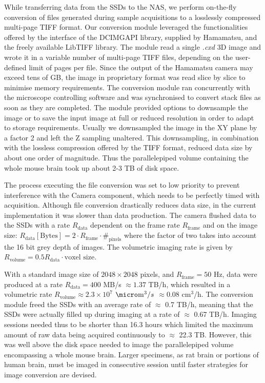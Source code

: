\documentclass[12pt]{spieman}  %
\begin{document}
\begin{spacing}{2}
While transferring data from the SSDs to the NAS, we perform on-the-fly conversion of files generated during sample acquisitions to a losslessly compressed multi-page TIFF format. Our conversion module leveraged the functionalities offered by the interface of the DCIMGAPI library, supplied by Hamamatsu, and the freely available LibTIFF library. The module read a single \textit{.cxd} 3D image and wrote it in a variable number of multi-page TIFF files, depending on the user-defined limit of pages per file. Since the output of the Hamamatsu camera may exceed tens of GB, the image in proprietary format was read slice by slice to minimise memory requirements. The conversion module ran concurrently with the microscope controlling software and was synchronised to convert stack files as soon as they are completed. The module provided options to downsample the image or to save the input image at full or reduced resolution in order to adapt to storage requirements. Usually we downsampled the image in the XY plane by a factor 2 and left the Z sampling unaltered. This downsampling, in combination with the lossless compression offered by the TIFF format, reduced data size by about one order of magnitude. Thus the parallelepiped volume containing the whole mouse brain took up about 2-3 TB of disk space. 

The process executing the file conversion was set to low priority to prevent interference with the Camera component, which needs to be perfectly timed with acquisition. Although file conversion drastically reduces data size, in the current implementation it was slower than data production. The camera flushed data to the SSDs with a rate $R_{\text{data}}$ dependent on the frame rate $R_{\text{frame}}$ and on the image size: $R_{\text{data}} [\text{Bytes}] = 2\cdot R_{\text{frame}} \cdot \#_{\text{pixels}}$
where the factor of two takes into account the 16 bit grey depth of images. The volumetric imaging rate is given by $R_{\text{volume}} = 0.5 R_{\text{data}} \cdot \text{voxel size}$.

With a standard image size of $2048 \times 2048$ pixels, and $R_{\text{frame}}=50$ Hz, data were produced at a rate $R_{\text{data}}=400$ MB/s $\approx 1.37$ TB/h, which resulted in a volumetric rate $R_{\text{volume}} \approx 2.3 \times 10^7$ $\micro\text{m}^3/s$ $\approx 0.08$ $\text{cm}^3$/h. The conversion module freed the SSDs with an average rate of $\approx$ 0.7 TB/h, meaning that the SSDs were actually filled up during imaging at a rate of $\approx$ 0.67 TB/h. Imaging sessions needed thus to be shorter than 16.3 hours which limited the maximum amount of raw data being acquired continuously to $\approx$ 22.3 TB. However, this was well above the disk space needed to image the parallelepiped volume encompassing a whole mouse brain. Larger specimens, as rat brain or portions of human brain, must be imaged in consecutive session until faster strategies for image conversion are devised.


\end{spacing}
\end{document}
